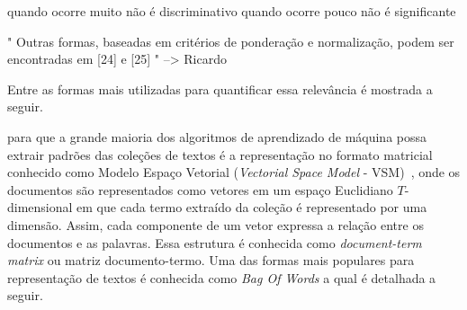 quando ocorre muito não é discriminativo
quando ocorre pouco não é significante




" Outras formas, baseadas em critérios de
ponderação e normalização, podem ser encontradas em
[24] e [25] " --> Ricardo







Entre as formas mais utilizadas para quantificar essa relevância é mostrada a seguir. 

para que a grande maioria dos algoritmos de aprendizado de máquina possa extrair padrões das coleções de textos é a representação no formato matricial conhecido como Modelo Espaço Vetorial (\textit{Vectorial Space Model} - VSM)~\cite{Rezende2003}, onde os documentos são representados como vetores em um espaço Euclidiano $T$-dimensional em que cada termo extraído da coleção é representado por uma dimensão. Assim, cada componente de um vetor expressa a relação entre os documentos e as palavras. Essa estrutura é conhecida como \textit{document-term matrix} ou matriz documento-termo. Uma das formas mais populares para representação de textos é conhecida como \textit{Bag Of Words} a qual é detalhada a seguir.





















